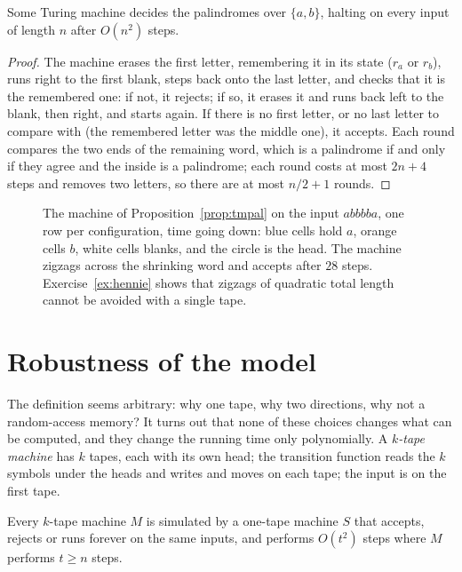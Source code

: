 \begin{proposition}\label{prop:tmpal}
Some Turing machine decides the palindromes over $\{a,b\}$, halting on every input of length $n$ after $O(n^2)$ steps.
\end{proposition}

\begin{proof}
The machine erases the first letter, remembering it in its state ($r_a$ or $r_b$), runs right to the first blank, steps back onto the last letter, and checks that it is the remembered one: if not, it rejects; if so, it erases it and runs back left to the blank, then right, and starts again. If there is no first letter, or no last letter to compare with (the remembered letter was the middle one), it accepts. Each round compares the two ends of the remaining word, which is a palindrome if and only if they agree and the inside is a palindrome; each round costs at most $2n+4$ steps and removes two letters, so there are at most $n/2+1$ rounds.
\end{proof}

\begin{figure}[ht]
\centering
{}
\caption{The machine of Proposition~\ref{prop:tmpal} on the input $abbbba$, one row per configuration, time going down: blue cells hold $a$, orange cells $b$, white cells blanks, and the circle is the head. The machine zigzags across the shrinking word and accepts after $28$ steps. Exercise~\ref{ex:hennie} shows that zigzags of quadratic total length cannot be avoided with a single tape.}
\label{fig:spacetime}
\end{figure}

\section{Robustness of the model}\label{sec:robust}

The definition seems arbitrary: why one tape, why two directions, why not a random-access memory? It turns out that none of these choices changes what can be computed, and they change the running time only polynomially. A \emph{$k$-tape machine} has $k$ tapes, each with its own head; the transition function reads the $k$ symbols under the heads and writes and moves on each tape; the input is on the first tape.

\begin{theorem}\label{thm:multitape}
Every $k$-tape machine $M$ is simulated by a one-tape machine $S$ that accepts, rejects or runs forever on the same inputs, and performs $O(t^2)$ steps where $M$ performs $t\ge n$ steps.
\end{theorem}


